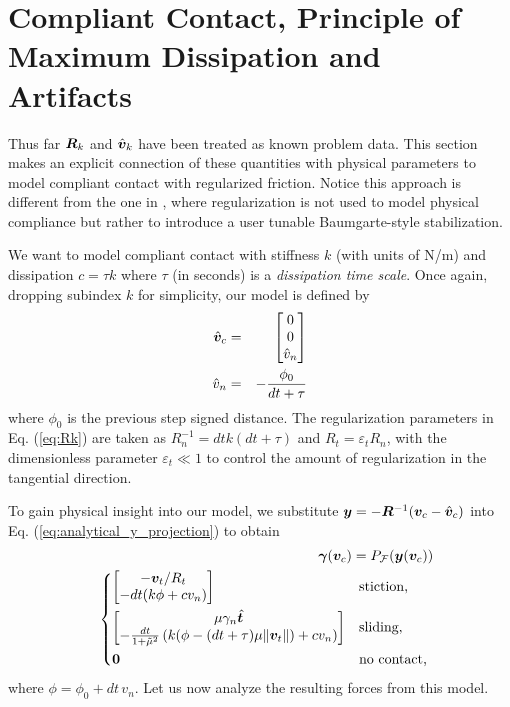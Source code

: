 \section{Compliant Contact, Principle of Maximum Dissipation and Artifacts}
\label{sec:physical_intuition}

Thus far ${\bm{R}}_k$ and $\hat{{\bm{v}}}_k$ have been treated as known problem
data. This section makes an explicit connection of these quantities with
physical parameters to model compliant contact with regularized friction. Notice
this approach is different from the one in \cite{bib:todorov2014}, where
regularization is not used to model physical compliance but rather to introduce
a user tunable Baumgarte-style stabilization.

We want to model compliant contact with stiffness $k$ (with units of N/m) and
dissipation $c = \tau k$ where $\tau$ (in seconds) is a \textit{dissipation time
scale}. Once again, dropping subindex $k$ for simplicity, our model is defined
by
\begin{eqnarray}
	\hat{{\bm{v}}}_c &=&
	\begin{bmatrix}
		0\\
		0\\
		\hat{v}_n \end{bmatrix}\nonumber\\
	\hat{v}_n &=& -\frac{\phi_0}{dt+\tau}
\end{eqnarray}
where $\phi_0$ is the previous step signed distance. The regularization
parameters in Eq. (\ref{eq:Rk}) are taken as $R_n^{-1} = dt k(dt+\tau)$ and
$R_t=\varepsilon_t R_n$, with the dimensionless parameter $\varepsilon_t \ll 1$
to control the amount of regularization in the tangential direction.

To gain physical insight into our model, we
substitute ${\bm{y}}=-{\bm{R}}^{-1}({\bm{v}}_c - \hat{{\bm{v}}}_c)$ into Eq.
(\ref{eq:analytical_y_projection}) to obtain
\begin{eqnarray}
	&&\bgamma(\vf{v}_c) = P_\mathcal{F}(\vf{y}(\vf{v}_c))
    \label{eq:gamma_analytical_from_vc}\\
&&\begin{dcases}
	\begin{bmatrix}
		-\vf{v}_t/R_t\\
		-dt(k\phi + c v_n)
	\end{bmatrix}
	& \text{stiction, } \\
	\begin{bmatrix}
		\mu\gamma_n\hat{\vf{t}}\\
		-\frac{dt}{1+\tilde\mu^2}\left(k(\phi-(dt+\tau)\mu\Vert\vf{v}_t\Vert) + cv_n \right)
	\end{bmatrix}
	& \text{sliding, }\\
    \vf{0} & \text{no contact, }
\end{dcases}\nonumber	
\end{eqnarray}
where $\phi= \phi_0 + dt\,v_n$. Let us now analyze the resulting forces from
this model.

